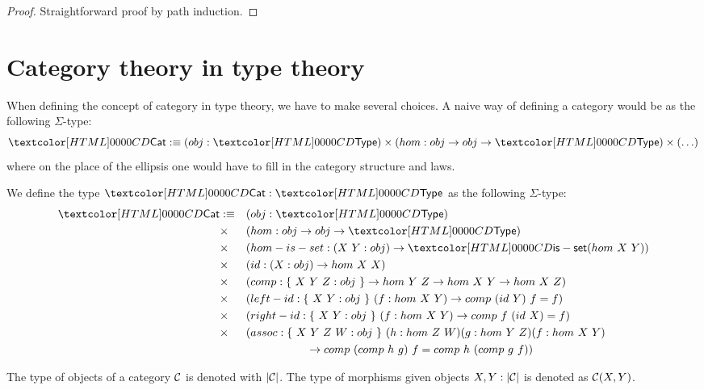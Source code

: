 \begin{lemma}
  
\end{lemma}

\begin{proof}
  Straightforward proof by path induction.
\end{proof}

\section{Category theory in type theory}

When defining the concept of category in type theory, we have to make
several choices. A naive way of defining a category would be as the
following $\Sigma$-type:
$$
\Cat \ddefeq (obj : \Type) \times (hom : obj \to obj \to \Type) \times (\hdots)
$$
where on the place of the ellipsis one would have to fill in the
category structure and laws. 

\begin{definition}[Category]
  We define the type $\Cat : \Type$ as the following $\Sigma$-type:
  \begin{align*}
    \Cat &\ddefeq &&(obj : \Type) \\
         &\times &&(hom : obj \to obj \to \Type) \\
         &\times &&(hom-is-set : (X\ Y : obj) \to \isset (hom\ X\ Y)) \\
         &\times &&(id : (X : obj) \to hom\ X\ X) \\
         &\times &&(comp : \{\ X\ Y\ Z : obj\ \} \to hom\ Y\ Z \to hom\ X\ Y \to hom\ X\ Z) \\
         &\times &&(left-id : \{\ X\ Y : obj\ \}\ (f : hom\ X\ Y) \to comp\ (id\ Y)\ f = f) \\
         &\times &&(right-id : \{\ X\ Y : obj\ \}\ (f : hom\ X\ Y) \to comp\ f\ (id\ X) = f) \\
         &\times &&(assoc : \{\ X\ Y\ Z\ W : obj\ \}\ (h : hom\ Z\ W) (g : hom\ Y\ Z) (f : hom\ X\ Y) \\
         & &&\ \ \ \ \ \ \ \ \ \ \ \ \ \ \ \ \to comp\ (comp\ h\ g)\ f = comp\ h\ (comp\ g\ f))
  \end{align*}
\end{definition}

The type of objects of a category $\mathcal{C}$ is denoted with $| \mathcal{C} |$. The
type of morphisms given objects $X, Y : | \mathcal{C} |$ is denoted as
$\mathcal{C}(X,Y)$.

